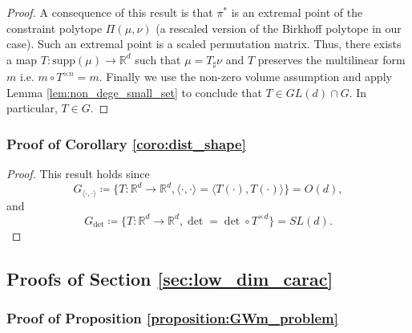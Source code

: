 \documentclass{article}
\newcommand{\R}{\mathbb{R}}
\newcommand{\1}{\mathbf{1}}
\theoremstyle{definition}
\theoremstyle{remark}
\begin{document}
\begin{appendices}
\begin{proof}
    A consequence of this result is  that $\pi^*$ is an extremal point of the constraint polytope $\Pi(\mu,\nu)$ (a rescaled version of the Birkhoff polytope in our case). Such an extremal point is a scaled permutation matrix. Thus, there exists a map $T:\mathrm{supp}(\mu)\to\R^d$ such that $\mu=T_\sharp\nu$ and  $T$ preserves the multilinear form $m$ i.e. $m\circ T^{\times n}=m$. Finally we use the non-zero volume assumption and apply Lemma \ref{lem:non_dege_small_set} to conclude that $T\in GL(d)\cap G$. In particular, $T\in G$.
\end{proof}

\subsubsection*{Proof of Corollary \ref{coro:dist_shape}}

\begin{proof}
    This result holds since \[G_{\langle\cdot,\cdot\rangle}\coloneqq{\{T:\R^d\to\R^d,\langle\cdot,\cdot\rangle=\langle T(\cdot),T(\cdot)\rangle\}} = O(d),\]
    and 
    \[G_{\det}\coloneqq{\{T:\R^d\to\R^d,\det=\det\circ T^{\times d}\}} = SL(d).\]
\end{proof}
\subsection{Proofs of Section \ref{sec:low_dim_carac}} \label{sec:supp-low_dim_carac}
\subsubsection*{Proof of Proposition \ref{proposition:GWm_problem}}



\end{appendices}
\end{document}
